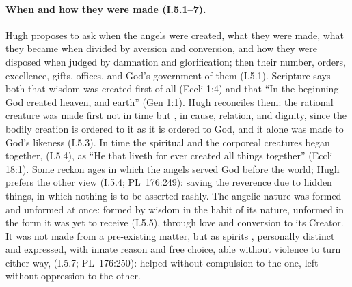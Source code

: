 \paragraph{When and how they were made (I.5.1--7).} Hugh proposes to ask when
the angels were created, what they were made, what they became when
divided by aversion and conversion, and how they were disposed when judged
by damnation and glorification; then their number, orders, excellence,
gifts, offices, and God's government of them (I.5.1). Scripture says both
that wisdom was created first of all (Eccli 1:4) and that ``In the
beginning God created heaven, and earth'' (Gen 1:1). Hugh reconciles them:
the rational creature was made first not in time but , in cause, relation, and dignity, since the bodily
creation is ordered to it as it is ordered to God, and it alone was made to
God's likeness (I.5.3). In time the spiritual and the corporeal creatures
began together, 
(I.5.4), as ``He that liveth for ever created all things together'' (Eccli
18:1). Some reckon ages in which the angels served God before the world;
Hugh prefers the other view  (I.5.4; PL~176:249): saving the reverence
due to hidden things, in which nothing is to be asserted rashly. The
angelic nature was formed and unformed at once: formed by wisdom in the
habit of its nature, unformed in the form it was yet to receive
 (I.5.5), through love
and conversion to its Creator. It was not made from a pre-existing matter,
but as spirits , personally distinct and expressed, with innate reason and
free choice, able without violence to turn either way,  (I.5.7;
PL~176:250): helped without compulsion to the one, left without oppression
to the other.

